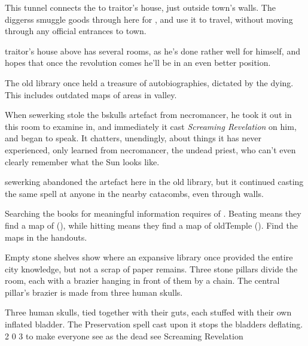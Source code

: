 \begin{multicols}{2}

This tunnel connects the  to \gls{traitor}'s house, just outside \gls{town}'s walls.
The \glspl{diggers} smuggle goods through here for , and use it to travel, without moving through any official entrances to \gls{town}.

\Gls{traitor}'s house above has several rooms, as he's done rather well for himself, and hopes that once the revolution comes he'll be in an even better position.


\begin{exampletext}
  The old library once held a treasure of autobiographies, dictated by the dying.
  This includes outdated maps of areas in \gls{valley}.

  When \gls{sewerking} stole the \gls{bskulls} \gls{artefact} from \gls{necromancer}, he took it out in this room to examine in, and immediately it cast \textit{Screaming Revelation} on him, and began to speak.
  It chatters, unendingly, about things it has never experienced, only learned from \gls{necromancer}, the undead priest, who can't even clearly remember what the Sun looks like.

  \Gls{sewerking} abandoned the \gls{artefact} here in the old library, but it continued casting the same spell at anyone in the nearby catacombs, even through walls.

\end{exampletext}

Searching the books for meaningful information requires  of .
Beating \tn[8] means they find a map of  (), while hitting \tn[11] means they find a map of \gls{oldTemple} ().
Find the maps in the handouts.

\begin{boxtext}
  Empty stone shelves show where an expansive library once provided the entire city knowledge, but not a scrap of paper remains.
  Three stone pillars divide the room, each with a brazier hanging in front of them by a chain.
  The central pillar's brazier is made from three human skulls.
\end{boxtext}

  {Three human skulls, tied together with their guts, each stuffed with their own inflated bladder.
  The Preservation spell cast upon it stops the bladders deflating.}%
  {2}%
  {0}%
  {3}%
  {to make everyone see as the dead see}%
  {Screaming Revelation}%
  {
    \setcounter{Fate}{2}
    \setcounter{Air}{2}
    \setcounter{Water}{1}
    \setcounter{Vigilance}{1}
    \setcounter{Academics}{1}
  }%


\end{multicols}
